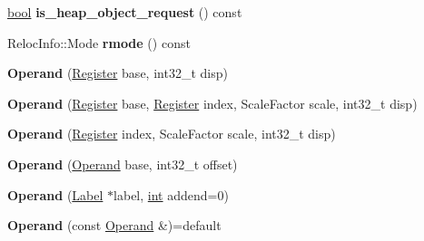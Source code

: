 \begin{DoxyCompactItemize}
\item 
\mbox{\label{classv8_1_1internal_1_1Operand_a7382bdb350d686c618496c1fa33e7896}} 
\mbox{\hyperlink{classbool}{bool}} {\bfseries is\+\_\+heap\+\_\+object\+\_\+request} () const
\item 
\mbox{\label{classv8_1_1internal_1_1Operand_a426ed4df4a3c04c315a06be3fe26fc3a}} 
Reloc\+Info\+::\+Mode {\bfseries rmode} () const
\item 
\mbox{\label{classv8_1_1internal_1_1Operand_a337eadcc06be14f928c97643189494c0}} 
{\bfseries Operand} (\mbox{\hyperlink{classv8_1_1internal_1_1Register}{Register}} base, int32\+\_\+t disp)
\item 
\mbox{\label{classv8_1_1internal_1_1Operand_ae473b7df0e6fc91fc219f6876eb958cf}} 
{\bfseries Operand} (\mbox{\hyperlink{classv8_1_1internal_1_1Register}{Register}} base, \mbox{\hyperlink{classv8_1_1internal_1_1Register}{Register}} index, Scale\+Factor scale, int32\+\_\+t disp)
\item 
\mbox{\label{classv8_1_1internal_1_1Operand_ae74a29227ef381fa0d234a40ca05827a}} 
{\bfseries Operand} (\mbox{\hyperlink{classv8_1_1internal_1_1Register}{Register}} index, Scale\+Factor scale, int32\+\_\+t disp)
\item 
\mbox{\label{classv8_1_1internal_1_1Operand_a5f210f1c59d5cb9fbe4e7b395e9d319d}} 
{\bfseries Operand} (\mbox{\hyperlink{classv8_1_1internal_1_1Operand}{Operand}} base, int32\+\_\+t offset)
\item 
\mbox{\label{classv8_1_1internal_1_1Operand_a2a1828e18961a690e24e33c4d908d9f5}} 
{\bfseries Operand} (\mbox{\hyperlink{classv8_1_1internal_1_1Label}{Label}} $\ast$label, \mbox{\hyperlink{classint}{int}} addend=0)
\item 
\mbox{\label{classv8_1_1internal_1_1Operand_a22af344a18b84a6f9a849d6aa40a2b1b}} 
{\bfseries Operand} (const \mbox{\hyperlink{classv8_1_1internal_1_1Operand}{Operand}} \&)=default
\item 

\end{DoxyCompactItemize}
